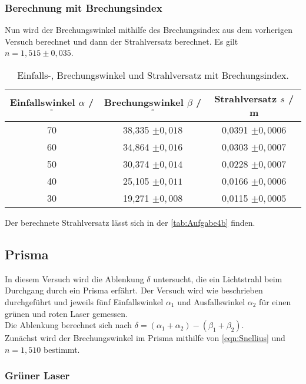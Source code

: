 \subsubsection{Berechnung mit Brechungsindex}

Nun wird der Brechungswinkel mithilfe des Brechungsindex aus dem vorherigen Versuch berechnet und dann
der Strahlversatz berechnet. Es gilt $n = 1,515 \pm 0,035$.
\begin{table}
  \centering
  \caption{Einfalls-, Brechungswinkel und Strahlversatz mit Brechungsindex.}
  \label{tab:Aufgabe4b}
  \begin{tabular}{c c c}
    \toprule
    Einfallswinkel $\alpha$ / $^{\circ}$& Brechungswinkel $\beta$ / $^{\circ}$ & Strahlversatz $s$ / m\\
    \midrule
    70 & 38,335 $\pm 0,018$ & 0,0391 $\pm 0,0006$\\
    60 & 34,864 $\pm 0,016$ & 0,0303 $\pm 0,0007$\\
    50 & 30,374 $\pm 0,014$ & 0,0228 $\pm 0,0007$\\
    40 & 25,105 $\pm 0,011$ & 0,0166 $\pm 0,0006$\\
    30 & 19,271 $\pm 0,008$ & 0,0115 $\pm 0,0005$\\
    \bottomrule
  \end{tabular}
\end{table}

Der berechnete Strahlversatz lässt sich in der \autoref{tab:Aufgabe4b} finden.\\

\subsection{Prisma}

In diesem Versuch wird die Ablenkung $\delta$ untersucht, die ein Lichtstrahl beim Durchgang durch ein Prisma erfährt.
Der Versuch wird wie beschrieben durchgeführt und jeweils fünf Einfallswinkel $\alpha_1$ und Ausfallswinkel $\alpha_2$ für einen 
grünen und roten Laser gemessen.\\
Die Ablenkung berechnet sich nach $\delta = (\alpha_1 + \alpha_2) - (\beta_1 + \beta_2)$.\\
Zunächst wird der Brechungswinkel im Prisma mithilfe von \autoref{eqn:Snellius} und $n=1,510$ bestimmt.

\subsubsection{Grüner Laser}

